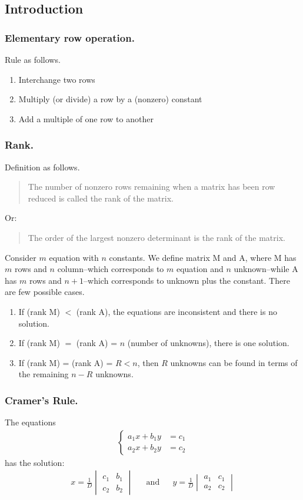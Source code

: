 \documentclass[../main.tex]{subfiles}
\begin{document}
\subsection*{Introduction}
\subsubsection*{Elementary row operation.} Rule as follows.
\begin{enumerate}
	\item Interchange two rows
	\item Multiply (or divide) a row by a (nonzero) constant
	\item Add a multiple of one row to another
\end{enumerate}

\subsubsection*{Rank.} Definition as follows.
\begin{quote}
	The number of nonzero rows remaining when a matrix has been row reduced is called the rank of the matrix.
\end{quote}
Or:
\begin{quote}
	The order of the largest nonzero determinant is the rank of the matrix.
\end{quote}

Consider $m$ equation with $n$ constants. We define matrix M and A, where M has $m$ rows and $n$ column--which corresponds to $m$ equation and $n$ unknown--while A has $m$ rows and $n+1$--which corresponds to unknown plus the constant. There are few possible cases.
\begin{enumerate}
	\item If (rank M) $<$ (rank A), the equations are inconsistent and there is no solution.
	\item If (rank M) $=$ (rank A) = $n$ (number of unknowns), there is one solution.
	\item If (rank M) = (rank A) = $R < n$, then $R$ unknowns can be found in terms of the remaining $n-R$ unknowns.
\end{enumerate}

\subsubsection*{Cramer's Rule.} The equations
\begin{align*}
	\begin{cases}
		a_1x+b_1y & =c_1 \\
		a_2x+b_2y & =c_2
	\end{cases}
\end{align*}
has the solution:
\begin{align*}
	x=\frac{1}{D}
	\begin{vmatrix}
		c_1 & b_1 \\
		c_2 & b_2
	\end{vmatrix} &  & \mathrm{and} &  &
	y=\frac{1}{D}
	\begin{vmatrix}
		a_1 & c_1 \\
		a_2 & c_2
	\end{vmatrix}
\end{align*}
\end{document}
